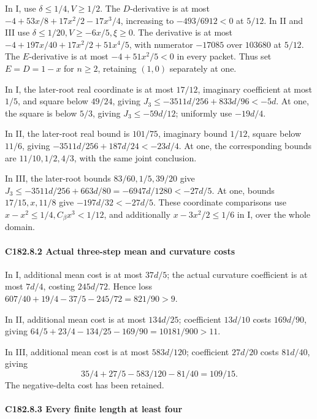 In I, use \(\delta\le1/4,\allowbreak \allowbreak  V\ge1/2\). The \(D\)-derivative is at most \(-4+53x/8+17x^2/2-17x^3/4\), increasing to \(-493/6912<0\) at \(5/12\). In II and III use \(\delta\le1/20,\allowbreak \allowbreak  V\ge-6x/5,\allowbreak \allowbreak  \xi\ge0\). The derivative is at most \(-4+197x/40+17x^2/2+51x^4/5\), with numerator \(-17085\) over \(103680\) at \(5/12\). The \(E\)-derivative is at most \(-4+51x^2/5<0\) in every packet. Thus set \(E=D=1-x\) for \(n\ge2\), retaining \((1,\allowbreak \allowbreak  0)\) separately at one.

In I, the later-root real coordinate is at most \(17/12\), imaginary coefficient at most \(1/5\), and square below \(49/24\), giving \(J_3\le-3511d/256+833d/96<-5d\). At one, the square is below \(5/3\), giving \(J_3\le-59d/12\); uniformly use \(-19d/4\).

In II, the later-root real bound is \(101/75\), imaginary bound \(1/12\), square below \(11/6\), giving \(-3511d/256+187d/24<-23d/4\). At one, the corresponding bounds are \(11/10,\allowbreak \allowbreak  1/2,\allowbreak \allowbreak  4/3\), with the same joint conclusion.

In III, the later-root bounds \(83/60,\allowbreak \allowbreak  1/5,\allowbreak \allowbreak  39/20\) give \(J_3\le-3511d/256+663d/80=-6947d/1280<-27d/5\). At one, bounds \(17/15,\allowbreak \allowbreak  x,\allowbreak \allowbreak  11/8\) give \(-197d/32<-27d/5\). These coordinate comparisons use \(x-x^2\le1/4,\allowbreak \allowbreak  C_\beta x^3<1/12\), and additionally \(x-3x^2/2\le1/6\) in I, over the whole domain.

\paragraph{C182.8.2 Actual three-step mean and curvature costs}

In I, additional mean cost is at most \(37d/5\); the actual curvature coefficient is at most \(7d/4\), costing \(245d/72\). Hence loss \(607/40+19/4-37/5-245/72=821/90>9\).

In II, additional mean cost is at most \(134d/25\); coefficient \(13d/10\) costs \(169d/90\), giving \(64/5+23/4-134/25-169/90=10181/900>11\).

In III, additional mean cost is at most \(583d/120\); coefficient \(27d/20\) costs \(81d/40\), giving
\[
 35/4+27/5-583/120-81/40=109/15.                    \tag{C182.44}
\]
The negative-delta cost has been retained.

\paragraph{C182.8.3 Every finite length at least four}

